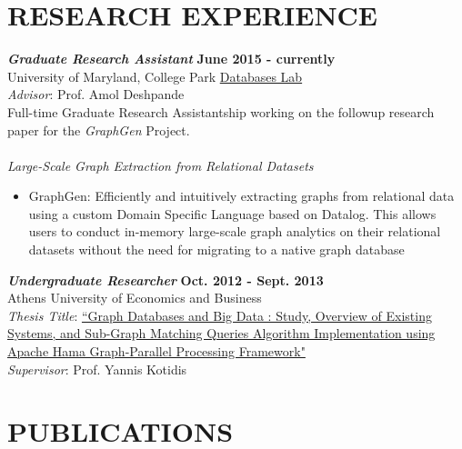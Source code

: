 \documentclass[margin, 10pt]{res} %
\begin{document}
\begin{resume}

\section{RESEARCH EXPERIENCE}

{\sl \textbf{Graduate Research Assistant}} \hfill \textbf{June 2015 - currently} \\
University of Maryland, College Park \href{http://www.cs.umd.edu/~amol/DBGroup/pubs.html}{Databases Lab}\\
\textit{Advisor}: Prof. Amol Deshpande\\
Full-time Graduate Research Assistantship working on the followup research paper
for the \textit{GraphGen} Project.\\
\\
{\sl Large-Scale Graph Extraction from Relational Datasets}\\
\begin{itemize}
  \item GraphGen: Efficiently and intuitively extracting graphs from relational data using a custom Domain Specific Language based on Datalog. This allows users to conduct in-memory large-scale graph analytics on their relational datasets without the need for migrating to a native graph database
\end{itemize}

{\sl \textbf{Undergraduate Researcher}} \hfill \textbf{Oct. 2012 - Sept. 2013}\\
Athens University of Economics and Business\\
\textit{Thesis Title}:
\href{https://drive.google.com/open?id=0B20MIwp_I7FlVFlNVWtQb3VXTmM}{``Graph Databases and Big Data : Study, Overview of Existing Systems, and Sub-Graph Matching Queries Algorithm Implementation using Apache Hama Graph-Parallel Processing Framework"}\\
\textit{Supervisor}: Prof. Yannis Kotidis


\section{PUBLICATIONS }


\end{resume}
\end{document}
